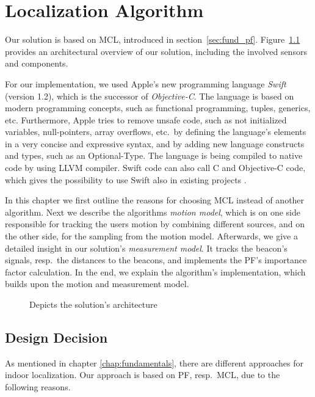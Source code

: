 \chapter{Localization Algorithm} \label{chap:pf}
Our solution is based on \acl{MCL}, introduced in section~\ref{sec:fund_pf}. Figure~\ref{fig:algo_architecture} provides an architectural overview of our solution, including the involved sensors and components.

For our implementation, we used Apple's new programming language \emph{Swift} (version 1.2), which is the successor of \emph{Objective-C}. The language is based on modern programming concepts, such as functional programming, tuples, generics, etc. Furthermore, Apple tries to remove unsafe code, such as not initialized variables, null-pointers, array overflows, etc.\ by defining the language's elements in a very concise and expressive syntax, and by adding new language constructs and types, such as an Optional-Type. The language is being compiled to native code by using LLVM compiler. Swift code can also call C and Objective-C code, which gives the possibility to use Swift also in existing projects \citep{apple:swift}.

In this chapter we first outline the reasons for choosing \acs{MCL} instead of another algorithm. Next we describe the algorithms \emph{motion model}, which is on one side responsible for tracking the users motion by combining different sources, and on the other side, for the sampling from the motion model. Afterwards, we give a detailed insight in our solution's \emph{measurement model}. It tracks the beacon's signals, resp.\ the distances to the beacons, and implements the \acs{PF}'s importance factor calculation. In the end, we explain the algorithm's implementation, which builds upon the motion and measurement model.


\begin{figure}
	
	\caption{Depicts the solution's architecture}
	\label{fig:algo_architecture}
\end{figure}

\section{Design Decision} \label{sec:algo_decision}
As mentioned in chapter \ref{chap:fundamentals}, there are different approaches for indoor localization. Our approach is based on \acl{PF}, resp.\ \acl{MCL}, due to the following reasons.

